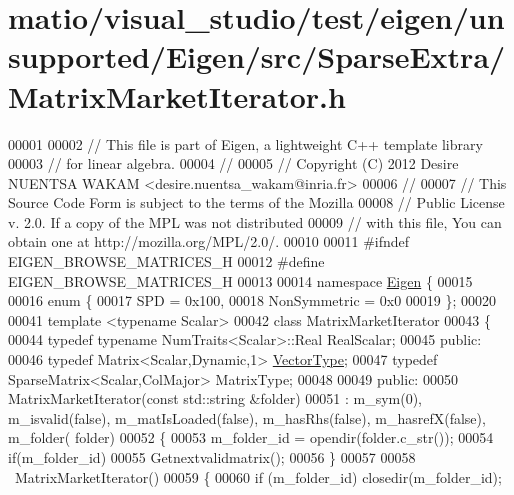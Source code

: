 \hypertarget{matio_2visual__studio_2test_2eigen_2unsupported_2_eigen_2src_2_sparse_extra_2_matrix_market_iterator_8h_source}{}\section{matio/visual\+\_\+studio/test/eigen/unsupported/\+Eigen/src/\+Sparse\+Extra/\+Matrix\+Market\+Iterator.h}
\label{matio_2visual__studio_2test_2eigen_2unsupported_2_eigen_2src_2_sparse_extra_2_matrix_market_iterator_8h_source}

\begin{DoxyCode}
00001 
00002 \textcolor{comment}{// This file is part of Eigen, a lightweight C++ template library}
00003 \textcolor{comment}{// for linear algebra.}
00004 \textcolor{comment}{//}
00005 \textcolor{comment}{// Copyright (C) 2012 Desire NUENTSA WAKAM <desire.nuentsa\_wakam@inria.fr>}
00006 \textcolor{comment}{//}
00007 \textcolor{comment}{// This Source Code Form is subject to the terms of the Mozilla}
00008 \textcolor{comment}{// Public License v. 2.0. If a copy of the MPL was not distributed}
00009 \textcolor{comment}{// with this file, You can obtain one at http://mozilla.org/MPL/2.0/.}
00010 
00011 \textcolor{preprocessor}{#ifndef EIGEN\_BROWSE\_MATRICES\_H}
00012 \textcolor{preprocessor}{#define EIGEN\_BROWSE\_MATRICES\_H}
00013 
00014 \textcolor{keyword}{namespace }\hyperlink{namespace_eigen}{Eigen} \{
00015 
00016 \textcolor{keyword}{enum} \{
00017   SPD = 0x100,
00018   NonSymmetric = 0x0
00019 \}; 
00020 
00041 \textcolor{keyword}{template} <\textcolor{keyword}{typename} Scalar>
00042 \textcolor{keyword}{class }MatrixMarketIterator 
00043 \{
00044     \textcolor{keyword}{typedef} \textcolor{keyword}{typename} NumTraits<Scalar>::Real RealScalar;
00045   \textcolor{keyword}{public}:
00046     \textcolor{keyword}{typedef} Matrix<Scalar,Dynamic,1> \hyperlink{struct_vector_type}{VectorType}; 
00047     \textcolor{keyword}{typedef} SparseMatrix<Scalar,ColMajor> MatrixType; 
00048   
00049   \textcolor{keyword}{public}:
00050     MatrixMarketIterator(\textcolor{keyword}{const} std::string &folder)
00051       : m\_sym(0), m\_isvalid(false), m\_matIsLoaded(false), m\_hasRhs(false), m\_hasrefX(false), m\_folder(
      folder)
00052     \{
00053       m\_folder\_id = opendir(folder.c\_str());
00054       \textcolor{keywordflow}{if}(m\_folder\_id)
00055         Getnextvalidmatrix();
00056     \}
00057     
00058     ~MatrixMarketIterator()
00059     \{
00060       \textcolor{keywordflow}{if} (m\_folder\_id) closedir(m\_folder\_id); 

\end{DoxyCode}
